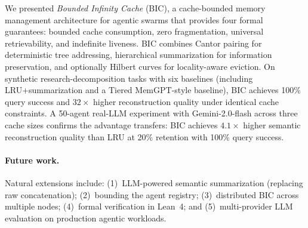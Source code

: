 We presented \emph{Bounded Infinity Cache} (BIC), a cache-bounded
memory management architecture for agentic swarms that provides four
formal guarantees: bounded cache consumption, zero fragmentation,
universal retrievability, and indefinite liveness.  BIC combines
Cantor pairing for deterministic tree addressing, hierarchical
summarization for information preservation, and optionally Hilbert
curves for locality-aware eviction.  On synthetic research-decomposition tasks
with six baselines (including LRU+summarization and a Tiered
MemGPT-style baseline), BIC achieves 100\% query success and
$32\times$ higher reconstruction quality under identical cache
constraints.  A 50-agent real-LLM experiment with Gemini-2.0-flash across
three cache sizes confirms the advantage transfers: BIC achieves
$4.1\times$ higher semantic reconstruction quality than LRU at 20\%
retention with 100\% query success.

\paragraph{Future work.}
Natural extensions include: (1)~LLM-powered semantic summarization
(replacing raw concatenation); (2)~bounding the agent registry;
(3)~distributed BIC across multiple nodes; (4)~formal verification
in Lean~4; and (5)~multi-provider LLM evaluation on production agentic
workloads.
